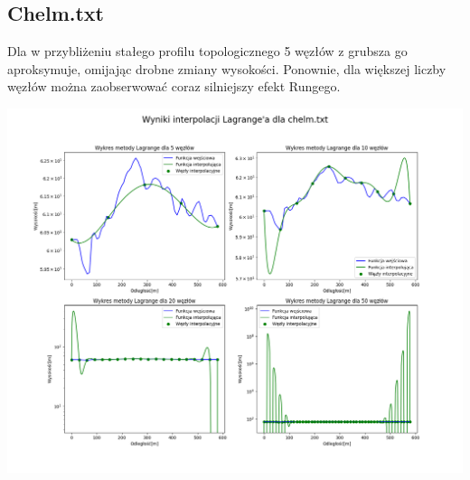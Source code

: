 \documentclass[a4paper,12pt]{article}
\begin{document}
	\subsection{Chelm.txt}
	Dla w przybliżeniu stałego profilu topologicznego 5 węzłów z grubsza go aproksymuje, omijając drobne zmiany wysokości. Ponownie, dla większej liczby węzłów można zaobserwować coraz silniejszy efekt Rungego.
	\begin{center}
        \includegraphics[scale=0.4]{../charts/lagrange_chelm.png}
    \end{center}
    
    \newpage
\end{document}
